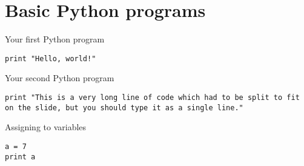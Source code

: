 \part{Basic Python programs}
\frame{\partpage}

\begin{frame}[fragile]{Your first Python program}
	\begin{lstlisting}
print "Hello, world!"
	\end{lstlisting}
\end{frame}

\begin{frame}[fragile]{Your second Python program}
	\begin{lstlisting}
print "This is a very long line of code which had to be split to fit on the slide, but you should type it as a single line."
	\end{lstlisting}
\end{frame}

\begin{frame}[fragile]{Assigning to variables}
	\begin{lstlisting}
a = 7
print a
	\end{lstlisting}
\end{frame}

